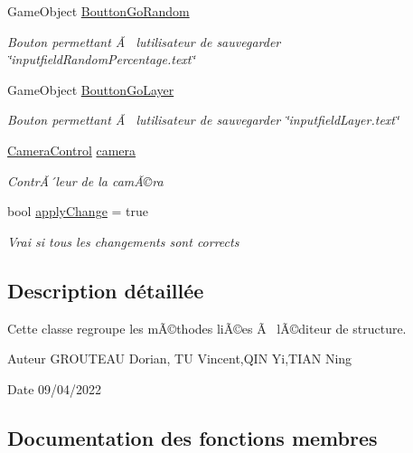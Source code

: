 \begin{DoxyCompactItemize}
Game\+Object \mbox{\hyperlink{class_edit_mode_manager_a945ba1a2fb0835b8dc12d723683eeb33}{Boutton\+Go\+Random}}
\begin{DoxyCompactList}\small\item\em Bouton permettant Ã  l\textquotesingle{}utilisateur de sauvegarder \char`\"{}inputfield\+Random\+Percentage.\+text\char`\"{} \end{DoxyCompactList}\item 
Game\+Object \mbox{\hyperlink{class_edit_mode_manager_ad5c5ed8457e18b2adc75f38498d28e92}{Boutton\+Go\+Layer}}
\begin{DoxyCompactList}\small\item\em Bouton permettant Ã  l\textquotesingle{}utilisateur de sauvegarder \char`\"{}inputfield\+Layer.\+text\char`\"{} \end{DoxyCompactList}\item 
\mbox{\hyperlink{class_camera_control}{Camera\+Control}} \mbox{\hyperlink{class_edit_mode_manager_a5cfa2a3b82fbc098b2fc63f043f1b07b}{camera}}
\begin{DoxyCompactList}\small\item\em ContrÃ´leur de la camÃ©ra \end{DoxyCompactList}\item 
bool \mbox{\hyperlink{class_edit_mode_manager_af3f46c507dd0557ad3890647be53bdb0}{apply\+Change}} = true
\begin{DoxyCompactList}\small\item\em Vrai si tous les changements sont corrects \end{DoxyCompactList}\end{DoxyCompactItemize}


\subsection{Description détaillée}
Cette classe regroupe les mÃ©thodes liÃ©es Ã  l\textquotesingle{}Ã©diteur de structure. 

\begin{DoxyAuthor}{Auteur}
G\+R\+O\+U\+T\+E\+AU Dorian, TU Vincent,Q\+IN Yi,T\+I\+AN Ning 
\end{DoxyAuthor}
\begin{DoxyDate}{Date}
09/04/2022 
\end{DoxyDate}


\subsection{Documentation des fonctions membres}
\mbox{\label{class_edit_mode_manager_ac9e73b653a4af1d833a2df57c45cf4cf}} 
